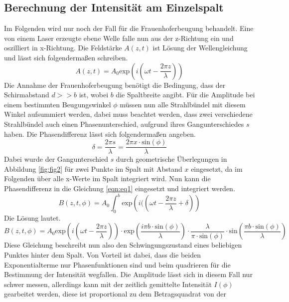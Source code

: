 \subsection{Berechnung der Intensität am Einzelspalt}
Im Folgenden wird nur noch der Fall für die Frauenhoferbeugung behandelt. 
Eine von einem Laser erzeugte ebene Welle falle nun aus der z-Richtung ein und oszilliert in x-Richtung. Die Feldstärke $A(z,t)$ ist Lösung der Wellengleichung und lässt sich folgendermaßen schreiben.
\begin{equation}
    \label{eqn:eq1}
   A(z,t)  = A_{0} \text{exp}\left(i\left(\omega t - \frac{2\pi z}{\lambda} \right)\right)
\end{equation}
 Die Annahme der Frauenhoferbeugung benötigt die Bedingung, dass der Schirmabstand $d >> b$ ist, wobei $b$ die Spaltbreite angibt. Für die Amplitude bei einem bestimmten Beugungswinkel $\phi$ müssen nun alle Strahlbündel mit diesem Winkel aufsummiert werden, dabei muss beachtet werden, dass zwei verschiedene Strahlbündel auch einen Phasenunterschied, aufgrund ihres Gangunterschiedes $s$ haben. Die Phasendifferenz lässt sich folgendermaßen angeben.
 \begin{equation}
     \delta = \frac{2\pi s}{\lambda} = \frac{2\pi x \cdot \text{sin}(\phi) }{\lambda}
 \end{equation}
Dabei wurde der Gangunterschied $s$ durch geometrische Überlegungen in Abbildung \ref{fig:fig2} für zwei Punkte im Spalt mit Abstand $x$ eingesetzt, da im Folgenden über alle x-Werte im Spalt integriert wird.
Nun kann die Phasendifferenz in die Gleichung \eqref{eqn:eq1} eingesetzt und integriert werden.
\begin{equation}
B(z, t, \phi) =  A_{0} \int_{0}^{b} \text{exp} \left( i(\left( \omega t - \frac{2\pi z}{\lambda} + \delta\right)\right)
\end{equation}
Die Lösung lautet.
\begin{equation}
    \label{eqn:eq2}
    B(z, t, \phi) =  A_{0} \text{exp}\left(i\left(\omega t - \frac{2\pi z}{\lambda} \right)\right) \cdot \text{exp}\left( \frac{i \pi b \cdot \text{sin}(\phi)}{\lambda}\right) \cdot \frac{\lambda}{\pi \cdot \text{sin}(\phi)} \cdot \text{sin}\left( \frac{\pi b  \cdot \text{sin}(\phi)}{\lambda} \right)
\end{equation}
Diese Gleichung beschreibt nun also den Schwingungszustand eines beliebigen Punktes hinter dem Spalt. Von Vorteil ist dabei, dass die beiden Exponentialterme nur Phasenfunktionen sind und 
beim quadrieren für die Bestimmung der Intensität wegfallen. Die Amplitude lässt sich in diesem Fall nur schwer messen, allerdings kann mit der zeitlich gemittelte Intensität $I(\phi)$ gearbeitet werden, diese ist proportional zu dem Betragsquadrat von der 
